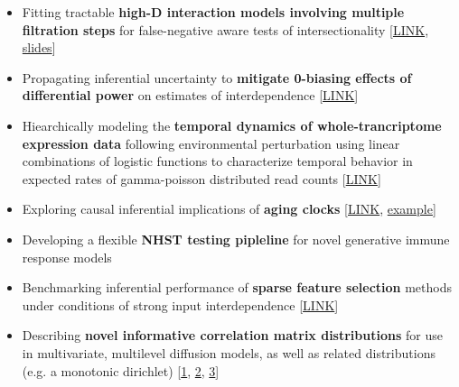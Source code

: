 \documentclass[12pt]{article}
\begin{document}
\begin{itemize}[noitemsep]
\item Fitting tractable \textbf{high-D interaction models involving multiple filtration steps} for false-negative aware tests of intersectionality  [\href{https://github.com/NikVetr/minor\_scripts/blob/master/postdoc/pipeline\_problems.R}{LINK}, \href{https://docs.google.com/presentation/d/15VzbHIvp0oMQNcg4B82MdzEfSzld8TqD/}{slides}]

\item Propagating inferential uncertainty to \textbf{mitigate 0-biasing effects of differential power} on estimates of interdependence  [\href{https://github.com/NikVetr/minor\_scripts/blob/master/postdoc/propagate\_uncertainty\_correlations.R}{LINK}]

\item Hiearchically modeling the \textbf{temporal dynamics of whole-trancriptome expression data} following environmental perturbation using linear combinations of logistic functions to characterize temporal behavior in expected rates of gamma-poisson distributed read counts [\href{https://github.com/NikVetr/montgomery_lab/blob/61e2ac4b0fea0ee7f5bf31590a40378f0027264a/growth\_and\_decay\_processes.R#L8}{LINK}]

\item Exploring causal inferential implications of \textbf{aging clocks} [\href{https://github.com/NikVetr/montgomery\_lab/blob/61e2ac4b0fea0ee7f5bf31590a40378f0027264a/collider\_effects\_on\_R2.R#L4}{LINK}, \href{https://drive.google.com/file/d/1AQU0YMVoYCEFuIICHGIXGxoXm6dj7HxY/view}{example}]

\item Developing a flexible \textbf{NHST testing pipleline} for novel generative immune response models


\item Benchmarking inferential performance of \textbf{sparse feature selection} methods under conditions of strong input interdependence [\href{https://github.com/NikVetr/minor\_scripts/blob/master/postdoc/sparse\_var\_selection\_test.R}{LINK}]


\item Describing \textbf{novel informative correlation matrix distributions} for use in multivariate,  multilevel diffusion models, as well as related distributions (e.g. a monotonic dirichlet) [\href{https://github.com/NikVetr/dissertation\_work/blob/master/informative\_corrmat\_prior.R}{1},  \href{https://github.com/NikVetr/minor\_scripts/blob/master/postdoc/cmat-eigenconstraints\_Stan.R}{2}, \href{https://github.com/NikVetr/minor\_scripts/blob/master/postdoc/ordered\_dirichlet.r}{3}]


\end{itemize}
\end{document}

